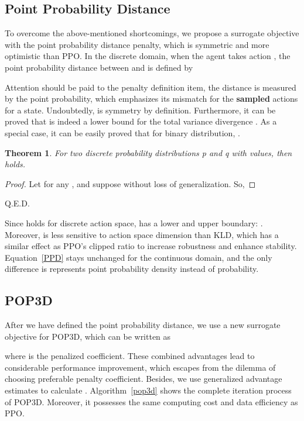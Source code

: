 \documentclass{article}
\newtheorem{theorem}{Theorem}
\newtheorem{proof}{Proof}
\begin{document}
\subsection{Point Probability Distance}

To overcome the above-mentioned shortcomings, we propose a surrogate objective with the point probability distance penalty, which is symmetric and more optimistic than PPO. In the discrete domain, when the agent takes action , the point probability distance between    and     is defined by



Attention should be paid to the penalty definition item, the distance is measured by the point probability, which emphasizes its mismatch for the \textbf{sampled} actions for a state.   
Undoubtedly,  is symmetry by definition. Furthermore, it can be proved that  is indeed a lower bound for the total variance divergence . As a special case, it can be easily proved that for binary distribution, . 


\begin{theorem}
	For two discrete probability distributions p and q with  values,  then  holds.
\end{theorem}
\begin{proof}
	Let   for any , and suppose  without loss of generalization. So,
	
	
\end{proof}
Q.E.D.


Since  holds for discrete action space,   has a lower and upper boundary: . Moreover,  is less sensitive to action space dimension than KLD, which has a similar effect as PPO's clipped ratio to increase robustness and enhance stability.\\

Equation~\ref{PPD} stays unchanged for the continuous domain, and the only difference is   represents point probability density instead of probability.
\subsection{POP3D}
After we have defined the point probability distance, we use a new surrogate objective for POP3D, which can be written as 

where  is the penalized coefficient. These combined advantages  lead to considerable performance improvement, which escapes from the dilemma of choosing preferable penalty coefficient. Besides, we use generalized advantage estimates to calculate . Algorithm~\ref{pop3d} shows the complete iteration process of POP3D. Moreover, it possesses the same computing cost and data efficiency as PPO. 
\end{document}

